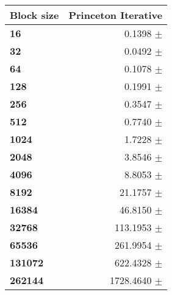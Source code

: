 \begin{tabular}{lr}\toprule
\textbf{Block size}  & \textbf{Princeton Iterative}\\\midrule
\textbf{16}  & 0.1398 $\pm$ \\
\textbf{32}  & 0.0492 $\pm$ \\
\textbf{64}  & 0.1078 $\pm$ \\
\textbf{128}  & 0.1991 $\pm$ \\
\textbf{256}  & 0.3547 $\pm$ \\
\textbf{512}  & 0.7740 $\pm$ \\
\textbf{1024}  & 1.7228 $\pm$ \\
\textbf{2048}  & 3.8546 $\pm$ \\
\textbf{4096}  & 8.8053 $\pm$ \\
\textbf{8192}  & 21.1757 $\pm$ \\
\textbf{16384}  & 46.8150 $\pm$ \\
\textbf{32768}  & 113.1953 $\pm$ \\
\textbf{65536}  & 261.9954 $\pm$ \\
\textbf{131072}  & 622.4328 $\pm$ \\
\textbf{262144} & 1728.4640 $\pm$ \\
\bottomrule
\end{tabular}
